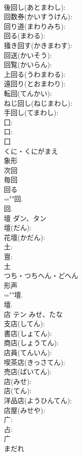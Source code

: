 \documentclass[8pt]{extreport}
\begin{document}
\begin{CJK}{UTF8}{min}
\\	後回し(あとまわし): 
\\	回数券(かいすうけん): 
\\	回り道(まわりみち): 
\\	回る(まわる): 
\\	掻き回す(かきまわす): 
\\	回送(かいそう): 
\\	回覧(かいらん): 
\\	上回る(うわまわる): 
\\	遠回り(とおまわり): 
\\	転回(てんかい): 
\\	ねじ回し(ねじまわし): 
\\	手回し(てまわし): 
\\	囗: 
\\	口: 
\\	囗	
\\	くに・くにがまえ	
\\	象形 
\\	次回 
\\	毎回 
\\	回る 
\\	=""回.
\\	回.
\\	壇	ダン、タン			
\\	壇(だん): 
\\	花壇(かだん): 
\\	土: 
\\	亶: 
\\	土	
\\	つち・つちへん・どへん	
\\	形声 
\\	=""壇.
\\	壇.
\\	店	テン	みせ、たな		
\\	支店(してん): 
\\	書店(しょてん): 
\\	商店(しょうてん): 
\\	店員(てんいん): 
\\	喫茶店(きっさてん): 
\\	売店(ばいてん): 
\\	店(みせ): 
\\	店(てん): 
\\	洋品店(ようひんてん): 
\\	店屋(みせや): 
\\	广: 
\\	占: 
\\	广	
\\	まだれ	

\end{CJK}
\end{document}
